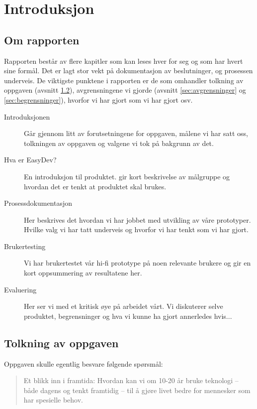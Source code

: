 \chapter{Introduksjon}

\section{Om rapporten}
Rapporten består av flere kapitler som kan leses hver for seg og som har hvert sine formål. Det er lagt stor vekt på dokumentasjon av beslutninger, og prosessen underveis. 
De viktigste punktene i rapporten er de som omhandler tolkning av oppgaven (avsnitt \ref{sec:tolkning}), avgrensningene vi gjorde (avsnitt \ref{sec:avgrensninger} og \ref{sec:begrensninger}), hvorfor vi har gjort som vi har gjort osv. 

\begin{description}

\item[Introduksjonen] Går gjennom litt av forutsetningene for oppgaven, målene vi har satt oss, tolkningen av oppgaven og valgene vi tok på bakgrunn av det. 

\item[Hva er EasyDev?] En introduksjon til produktet. gir kort beskrivelse av målgruppe og hvordan det er tenkt at produktet skal brukes.

\item[Prosessdokumentasjon] Her beskrives det hvordan vi har jobbet med utvikling av våre prototyper. Hvilke valg vi har tatt underveis og hvorfor vi har tenkt som vi har gjort.

\item[Brukertesting] Vi har brukertestet vår hi-fi prototype på noen relevante brukere og gir en kort oppsummering av resultatene her.

\item[Evaluering] Her ser vi med et kritisk øye på arbeidet vårt. Vi diskuterer selve produktet, begrensninger og hva vi kunne ha gjort annerledes hvis...

\end{description}



\section{Tolkning av oppgaven} \label{sec:tolkning}
Oppgaven skulle egentlig besvare følgende spørsmål: 
\begin{quote}
Et	blikk	inn	i	framtida:	Hvordan	kan	vi	om	10-20	år	bruke	teknologi	
– både	dagens	og	tenkt	framtidig	– til	å	gjøre	livet	bedre	for	
mennesker	som	har	spesielle behov.
\end{quote}

